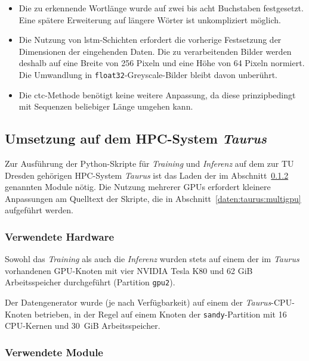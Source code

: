 \begin{itemize}
    \item Die zu erkennende Wortlänge wurde auf zwei bis acht Buchstaben festgesetzt. Eine spätere Erweiterung auf
          längere Wörter ist unkompliziert möglich.
    \item Die Nutzung von \gls{lstm}-Schichten erfordert die vorherige Festsetzung der Dimensionen der eingehenden
          Daten. Die zu verarbeitenden Bilder werden deshalb auf eine Breite von 256 Pixeln und eine Höhe von 64 Pixeln
          normiert. Die Umwandlung in \texttt{float32}-Greyscale-Bilder bleibt davon unberührt.
    \item Die \gls{ctc}-Methode benötigt keine weitere Anpassung, da diese prinzipbedingt mit Sequenzen beliebiger
          Länge umgehen kann.
\end{itemize}

\subsection{Umsetzung auf dem HPC-System \textit{Taurus}}
\label{daten:taurus}

Zur Ausführung der Python-Skripte für \textit{Training} und \textit{Inferenz} auf dem zur TU Dresden gehörigen
HPC-System \textit{Taurus} ist das Laden der im Abschnitt~\ref{daten:taurus:module} genannten Module nötig. Die Nutzung
mehrerer GPUs erfordert kleinere Anpassungen am Quelltext der Skripte, die in Abschnitt~\ref{daten:taurus:multigpu}
aufgeführt werden.

\subsubsection{Verwendete Hardware}
\label{daten:taurus:hardware}

Sowohl das \textit{Training} als auch die \textit{Inferenz} wurden stets auf einem der im \textit{Taurus} vorhandenen
GPU-Knoten mit vier NVIDIA Tesla K80 und 62 GiB Arbeitsspeicher durchgeführt (Partition \texttt{gpu2}).

Der Datengenerator wurde (je nach Verfügbarkeit) auf einem der \textit{Taurus}-CPU-Knoten betrieben, in der Regel auf
einem Knoten der \texttt{sandy}-Partition mit 16 CPU-Kernen und 30\ GiB Arbeitsspeicher.

\subsubsection{Verwendete Module}
\label{daten:taurus:module}

